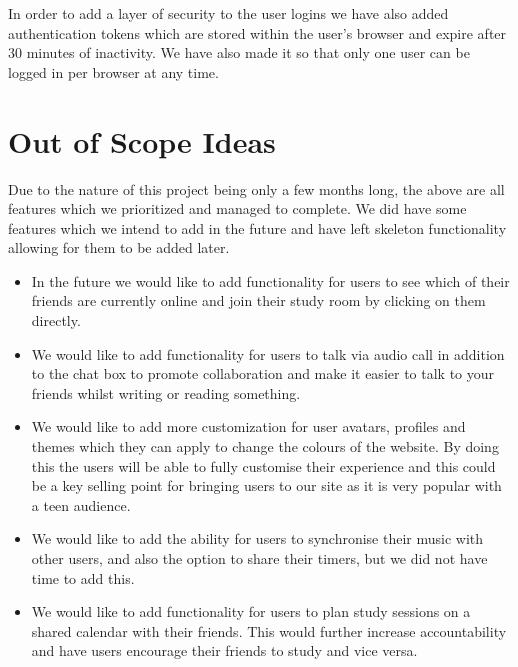 In order to add a layer of security to the user logins we have also added authentication tokens which are stored within the user's browser and expire after 30 minutes of inactivity. We have also made it so that only one user can be logged in per browser at any time.

\section{Out of Scope Ideas}
\label{sect:out-of-scope-ideas}

Due to the nature of this project being only a few months long, the above are all features which we prioritized and managed to complete. We did have some features which we intend to add in the future and have left skeleton functionality allowing for them to be added later.

\begin{itemize}
\item In the future we would like to add functionality for users to see which of their friends are currently online and join their study room by clicking on them directly.
\item We would like to add functionality for users to talk via audio call in addition to the chat box to promote collaboration and make it easier to talk to your friends whilst writing or reading something.
\item We would like to add more customization for user avatars, profiles and themes which they can apply to change the colours of the website. By doing this the users will be able to fully customise their experience and this could be a key selling point for bringing users to our site as it is very popular with a teen audience.
\item We would like to add the ability for users to synchronise their music with other users, and also the option to share their timers, but we did not have time to add this.
\item We would like to add functionality for users to plan study sessions on a shared calendar with their friends. This would further increase accountability and have users encourage their friends to study and vice versa.
\end{itemize}